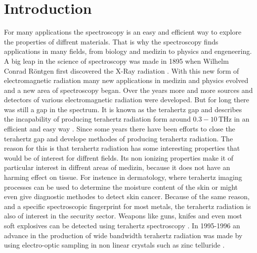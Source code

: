 \chapter{Introduction}
For many applications the spectroscopy is an easy and efficient way to explore the properties of diffrent materials.
That is why the spectroscopy finds applications in many fields, from biology and medizin to physics and engeneering.
A big leap in the science of spectroscopy was made in 1895 when Wilhelm Conrad Röntgen first discovered the X-Ray radiation \cite{roentgen}.
With this new form of electromagnetic radiation many new applications in medizin and physics evolved and a new area of spectroscopy began.
Over the years more and more sources and detectors of various electromagnetic radiation were developed.
But for long there was still a gap in the spectrum.
It is known as the terahertz gap and describes the incapability of producing terahertz radiation form around $0.3-10\,\si{\tera\hertz}$ in an efficient and easy way \cite[157--159]{THzgap_applications}.
Since some years there have been efforts to close the terahertz gap and develope methodes of producing terahertz radiation.
The reason for this is that terahertz radiation has some interesting properties that would be of interest for diffrent fields.
Its non ionizing properties make it of particular interest in diffrent areas of medizin, because it does not have an harming effect on tissue\cite[161--162]{THzgap_applications}.
For instence in dermatology, where terahertz imaging processes can be used to determine the moisture content of the skin or might even give diagnostic methodes to detect skin cancer\cite{terahertz_dermatology}. 
Because of the same reason, and a specific spectroscopic fingerprint for most metals, the terahertz radiation is also of interest in the security sector.
Weapons like guns, knifes and even most soft explosives can be detected using terahertz spectroscopy \cite[162]{THzgap_applications}\cite{thz_explosive_detec}.
In 1995-1996 an advance in the production of wide bandwidth terahertz radiation was made by using electro-optic sampling in non linear crystals such as zinc telluride \cite{first_eos_wu_zhang}\cite{ZnTe_Nahata_Weling_1996}.


